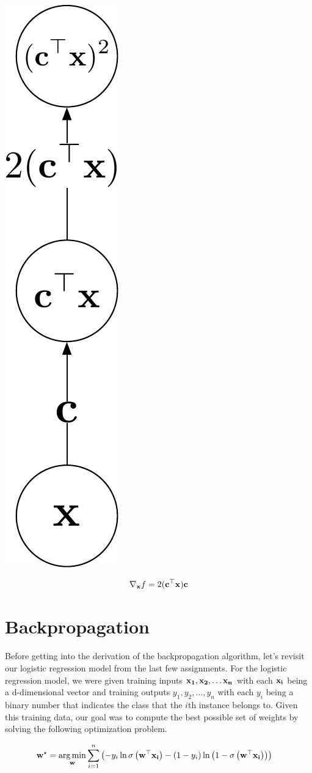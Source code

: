 \documentclass[assignment06_Solutions]{subfiles}
\begin{document}
\begin{exercise}[(20 minutes)]
\begin{boxedsolution}
\begin{center}
\includegraphics[width=0.1\linewidth]{figures/3bsolution}
\end{center}
\begin{align}
\nabla_{\mathbf{x}} f = 2(\mathbf{c}^\top \mathbf{x}) \mathbf{c}
\end{align}
\end{boxedsolution}
\ees
\end{exercise}


\section{Backpropagation}

Before getting into the derivation of the backpropagation algorithm, let's revisit our logistic regression model from the last few assignments.  For the logistic regression model, we were given training inputs $\mathbf{x_1}, \mathbf{x_2}, \ldots \mathbf{x_n}$ with each $\mathbf{x_i}$ being a d-dimensional vector and training outputs $y_1, y_2, \ldots, y_n$ with each $y_i$ being a binary number that indicates the class that the $i$th instance belongs to.  Given this training data, our goal was to compute the best possible set of weights by solving the following optimization problem.

\begin{align}
\mathbf{w^\star} &= \operatorname*{arg\,min}_{\mathbf{w}} \sum_{i=1}^n \left ( -y_i \ln \sigma\left (\mathbf{w}^\top \mathbf{x_i} \right) - (1-y_i) \ln \left ( 1 - \sigma\left (\mathbf{w}^\top \mathbf{x_i} \right) \right) \right)
\end{align}
\end{document}
